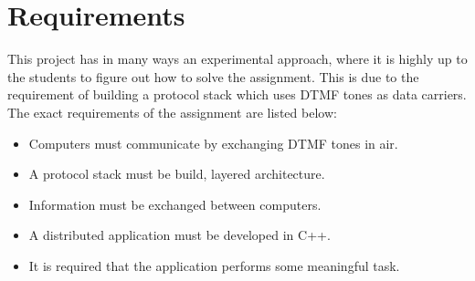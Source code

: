 \section{Requirements}
This project has in many ways an experimental approach, where it is highly up to the students to figure out how to solve the assignment. This is due to the requirement of building a protocol stack which uses DTMF tones as data carriers. The exact requirements of the assignment are listed below:

\begin{itemize}
\item Computers must communicate by exchanging DTMF tones in air.
\item A protocol stack must be build, layered architecture.
\item Information must be exchanged between computers.
\item A distributed application must be developed in C++.
\item It is required that the application performs some meaningful task.
\end{itemize}
